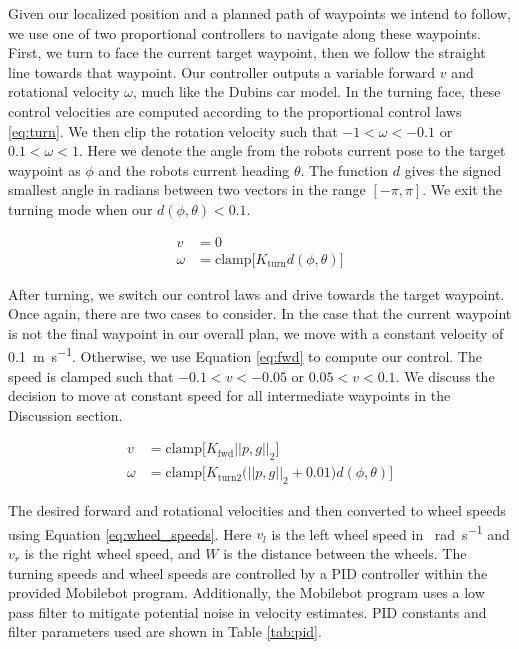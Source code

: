 \documentclass[journal]{IEEEtran}
\begin{document}
        Given our localized position and a planned path of waypoints we intend to follow, we use one of two proportional controllers to navigate along these waypoints. First, we turn to face the current target waypoint, then we follow the straight line towards that waypoint. Our controller outputs a variable forward $v$ and rotational velocity $\omega$, much like the Dubins car model. In the turning face, these control velocities are computed according to the proportional control laws \eqref{eq:turn}. We then clip the rotation velocity such that $-1 < \omega < -0.1$ or $0.1 < \omega < 1$. Here we denote the angle from the robots current pose to the target waypoint as $\phi$ and the robots current heading $\theta$. The function $d$ gives the signed smallest angle in radians between two vectors in the range $[-\pi,\pi]$. We exit the turning mode when our $d(\phi,\theta) < 0.1$.
        
        \begin{equation} \label{eq:turn}
            \begin{split}
             v &= 0 \\
             \omega &= \text{clamp}\Big[K_\text{turn}d(\phi,\theta)\Big]
            \end{split}
        \end{equation}
        
        After turning, we switch our control laws and drive towards the target waypoint. Once again, there are two cases to consider. In the case that the current waypoint is not the final waypoint in our overall plan, we move with a constant velocity of \SI{0.1}{\meter\per\second}. Otherwise, we use Equation \eqref{eq:fwd} to compute our control. The speed is clamped such that $-0.1 < v < -0.05$ or $0.05 < v < 0.1$. We discuss the decision to move at constant speed for all intermediate waypoints in the Discussion section.
        
        \begin{equation} \label{eq:fwd}
            \begin{split}
             v &=  \text{clamp}\Big[K_\text{fwd}||p, g||_2\Big] \\
             \omega &= \text{clamp}\Big[K_\text{turn2}\big(||p, g||_2+0.01\big)d(\phi,\theta)\Big]
            \end{split}
        \end{equation}
        
        The desired forward and rotational velocities and then converted to wheel speeds using Equation \eqref{eq:wheel_speeds}. Here $v_l$ is the left wheel speed in \SI{}{\radian\per\second} and $v_r$ is the right wheel speed, and $W$ is the distance between the wheels. The turning speeds and wheel speeds are controlled by a PID controller within the provided Mobilebot program. Additionally, the Mobilebot program uses a low pass filter to mitigate potential noise in velocity estimates. PID constants and filter parameters used are shown in Table \ref{tab:pid}.
        
\end{document}
